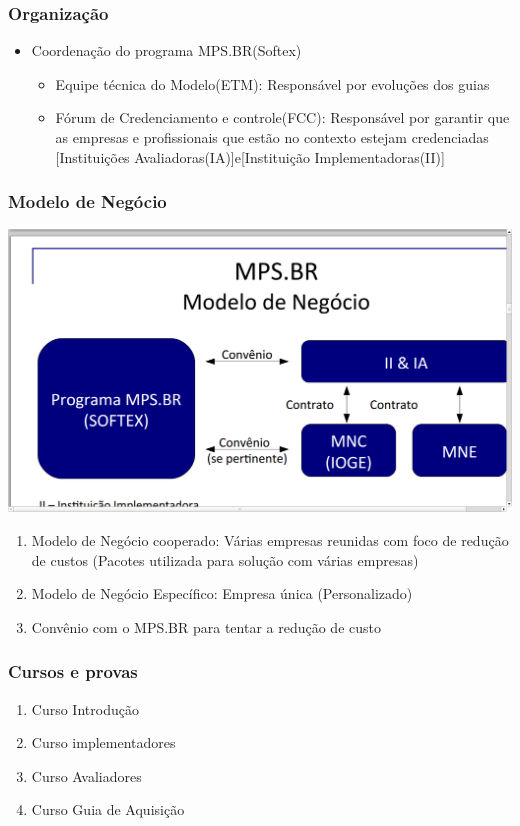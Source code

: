 \documentclass{article}
\begin{document}
\subsubsection{Organização}
	\begin{itemize}
	\item Coordenação do programa MPS.BR(Softex)
		\begin{itemize}
		\item Equipe técnica do Modelo(ETM): Responsável por evoluções dos guias
		\item Fórum de Credenciamento e controle(FCC): Responsável por garantir que as empresas e profissionais que estão no contexto estejam credenciadas [Instituições Avaliadoras(IA)]e[Instituição Implementadoras(II)]
		
		\end{itemize}			
	\end{itemize}


\subsubsection{Modelo de Negócio}
	\begin{center}
		\includegraphics[scale=0.25]{MPSBR_modelo_negocios}
	\end{center}	
	\begin{enumerate}
	\item Modelo de Negócio cooperado: Várias empresas reunidas com foco de redução de custos (Pacotes utilizada para solução com várias empresas)
	\item Modelo de Negócio Específico: Empresa única (Personalizado)
	\item Convênio com o MPS.BR para tentar a redução de custo 	
	\end{enumerate}

\subsubsection{Cursos e provas}
	\begin{enumerate}
	\item Curso Introdução
	\item Curso implementadores
	\item Curso Avaliadores
	\item Curso Guia de Aquisição
	\end{enumerate}		
\end{document}
